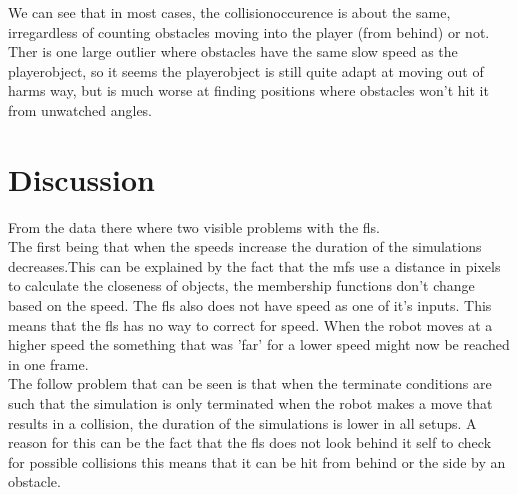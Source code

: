 \documentclass[conference]{IEEEtran}
\begin{document}
We can see that in most cases, the collisionoccurence is about the same, irregardless of counting obstacles moving into the player (from behind) or not. Ther is one large outlier where obstacles have the same slow speed as the playerobject, so it seems the playerobject is still quite adapt at moving out of harms way, but is much worse at finding positions where obstacles won't hit it from unwatched angles.

\section{Discussion}
From the data there where two visible problems with the fls.\\
The first being that when the speeds increase the duration of the simulations decreases.This can be explained by the fact that the mfs use a distance in pixels to calculate the closeness of objects, the membership functions don't change based on the speed. The fls also does not have speed as one of it's inputs. This means that the fls has no way to correct for speed. When the robot moves at a higher speed the something that was 'far' for a lower speed might now be reached in one frame.\\
The follow problem that can be seen is that when the terminate conditions are such that the simulation is only terminated when the robot makes a move that results in a collision, the duration of the simulations is lower in all setups. A reason for this can be the fact that the fls does not look behind it self to check for possible collisions this means that it can be hit from behind or the side by an obstacle.\\











\end{document}
